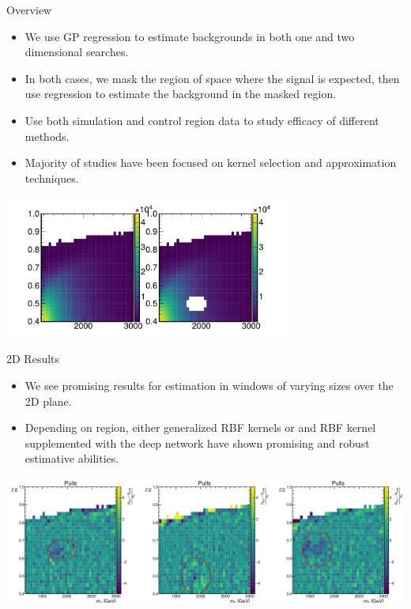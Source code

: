 \documentclass[10pt]{beamer}
\begin{document}
\begin{frame}{Overview}
  \begin{itemize}
  \item We use GP regression to estimate backgrounds in both one and two dimensional searches.
  \item In both cases, we mask the region of space where the signal is expected, then use regression to estimate the background in the masked region.
  \item Use both simulation and control region data to study efficacy of different methods. 
  \item Majority of studies have been focused on kernel selection and approximation techniques.
  \end{itemize}

  \begin{center}
    \includegraphics[width=0.7\textwidth]{figures/example_masking}
  \end{center}
\end{frame}

\begin{frame}{2D Results}
  \begin{itemize}
  \item We see promising results for estimation in windows of varying sizes over the 2D plane. 
  \item Depending on region, either generalized RBF kernels or and RBF kernel supplemented with the deep network have shown promising and robust estimative abilities.
  \end{itemize}

  \begin{center}
    \includegraphics[width=\textwidth]{figures/nn_results_1} 
  \end{center}
\end{frame}
\end{document}
